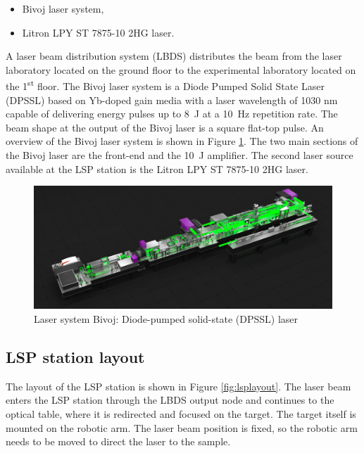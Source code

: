 \begin{itemize}
  \item Bivoj laser system,
  \item Litron LPY ST 7875-10 2HG laser.
\end{itemize}

 A laser beam distribution system (LBDS) distributes the beam from the laser laboratory located on the ground floor to the experimental laboratory located on the 1\textsuperscript{st} floor. The Bivoj laser system is a Diode Pumped Solid State Laser (DPSSL) based on Yb-doped gain media with a laser wavelength of 1030 nm capable of delivering energy pulses up to \SI{8}{\joule} at a \SI{10}{\hertz} repetition rate. The beam shape at the output of the Bivoj laser is a square flat-top pulse. An overview of the Bivoj laser system is shown in Figure \ref{fig:bivoj}. The two main sections of the Bivoj laser are the front-end and the \SI{10}{\joule} amplifier. The second laser source available at the LSP station is the Litron LPY ST 7875-10 2HG laser.
 
 \begin{figure}[h]
    \centering
    \includegraphics[width=1.0\linewidth]{img/bivoj.jpg}
    \caption{Laser system Bivoj: Diode-pumped solid-state (DPSSL) laser \protect\cite{bivojiso}}
    \label{fig:bivoj}
\end{figure}
 
 \subsection{LSP station layout}
 \label{sec:lsp_layout}

The layout of the LSP station is shown in Figure \ref{fig:lsplayout}. The laser beam enters the LSP station through the LBDS output node and
continues to the optical table, where it is redirected and
focused on the target. The target itself is mounted on the
robotic arm. The laser beam position is fixed, so the robotic
arm needs to be moved to direct the laser to the sample.

